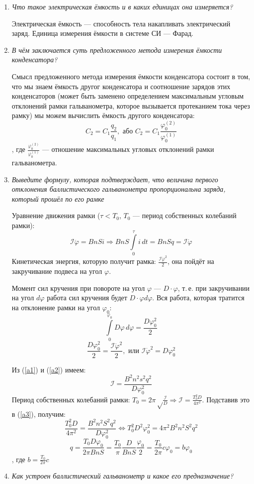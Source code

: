 \documentclass[a4paper,10pt]{article}
\begin{document}
\begin{enumerate}
\item \textit{Что такое электрическая ёмкость и в каких единицах она измеряется?}

Электрическая ёмкость --- способность тела накапливать электрический заряд.
Единица измерения ёмкости в системе СИ --- Фарад.
\item \textit{В чём заключается суть предложенного метода измерения ёмкости конденсатора?}

Смысл предложенного метода измерения ёмкости конденсатора состоит в том, что мы знаем ёмкость другог конденсатора и соотношение зарядов
этих конденсаторов (может быть заменено определением максимальным угловым отклонений рамки гальванометра,
которое вызывается протеканием тока через рамку) мы можем вычислить ёмкость другого конденсатора:
$$C_2 = C_1\frac{q_2}{q_1}, \text{ або  } C_2 = C_1\frac{\varphi_0^{\left(2\right)}}{\varphi_0^{\left(1\right)}}$$
, где $\frac{\varphi_0^{\left(2\right)}}{\varphi_0^{\left(1\right)}}$ --- отношение максимальных угловых отклонений рамки гальванометра.
\item \textit{Выведите формулу, которая подтверждает, что величина первого отклонения баллистического гальванометра пропорциональна
заряда, который прошёл по его рамке}

Уравнение движения рамки ($\tau < T_0$, $T_0$ --- период собственных колебаний рамки):
\begin{equation}\label{a1}
\mathcal{I}\ddot\varphi = BnSi \Rightarrow BnS\int\limits_0^\tau i\, dt = BnSq = \mathcal{I}\dot\varphi
\end{equation}
Кинетическая энергия, которую получит рамка: $\frac{\mathcal{I}\dot\varphi^2}{2}$, она пойдёт на закручивание подвеса на угол $\varphi$.

Момент сил кручения при повороте на угол $\varphi$ --- $D\cdot\varphi$, т.\,е. при закручивании на угол $d\varphi$ работа сил
кручения будет $D\cdot\varphi d\varphi$.
Вся работа, которая тратится на отклонение рамки на угол $\varphi_0$:
$$\int\limits_0^{\varphi_0} D\varphi\,d\varphi = \frac{D\varphi_0^2}{2}$$
\begin{equation}\label{a2}
\frac{D\varphi_0^2}{2} = \frac{\mathcal{I}\dot\varphi^2}{2}, \text{ или } \mathcal{I}\dot\varphi^2 = D\varphi_0^2
\end{equation}

Из (\ref{a1}) и (\ref{a2}) имеем:
\begin{equation}\label{a3}
\mathcal{I} = \frac{B^2n^2s^2q^2}{D\varphi_0^2}
\end{equation}
Период собственных колебаний рамки: $T_0 = 2\pi\sqrt\frac{\mathcal{I}}{D} \Rightarrow \mathcal{I} = \frac{T_0^2D}{4\pi^2}$.
Подставив это в (\ref{a3}), получим:
$$\frac{T_0^2D}{4\pi^2} = \frac{B^2n^2S^2q^2}{D\varphi_0^2} \Leftrightarrow T_0^2D^2\varphi_0^2 = 4\pi^2B^2n^2S^2q^2$$
$$q = \frac{T_0D\varphi_0}{2\pi B n S} = \frac{T_0}{\pi} \frac{D}{B n S} \frac{\varphi_0}{2} = \frac{T_0}{2\pi} c \varphi_0 = b \varphi_0$$
, где $b = \frac{T_0}{2\pi}c$
\item \textit{Как устроен баллистический гальванометр и какое его предназначение?}


\end{enumerate}
\end{document}
